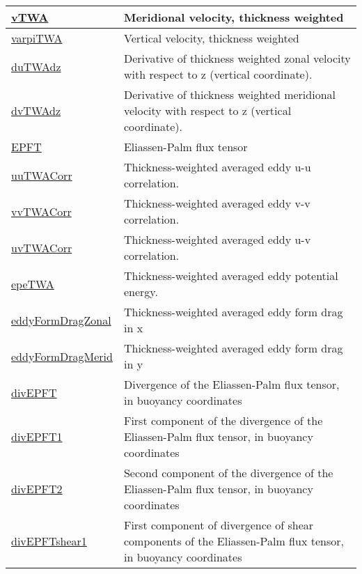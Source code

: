 {\begin{center}
\begin{longtable}{| p{2.0in} | p{4.0in} |}
    \hyperref[subsec:var_sec_eliassenPalmAM_vTWA]{vTWA} & Meridional velocity, thickness weighted \\
    \hline
    \hyperref[subsec:var_sec_eliassenPalmAM_varpiTWA]{varpiTWA} & Vertical velocity, thickness weighted \\
    \hline
    \hyperref[subsec:var_sec_eliassenPalmAM_duTWAdz]{duTWAdz} & Derivative of thickness weighted zonal velocity with respect to z (vertical coordinate). \\
    \hline
    \hyperref[subsec:var_sec_eliassenPalmAM_dvTWAdz]{dvTWAdz} & Derivative of thickness weighted meridional velocity with respect to z (vertical coordinate). \\
    \hline
    \hyperref[subsec:var_sec_eliassenPalmAM_EPFT]{EPFT} & Eliassen-Palm flux tensor \\
    \hline
    \hyperref[subsec:var_sec_eliassenPalmAM_uuTWACorr]{uuTWACorr} & Thickness-weighted averaged eddy u-u correlation. \\
    \hline
    \hyperref[subsec:var_sec_eliassenPalmAM_vvTWACorr]{vvTWACorr} & Thickness-weighted averaged eddy v-v correlation. \\
    \hline
    \hyperref[subsec:var_sec_eliassenPalmAM_uvTWACorr]{uvTWACorr} & Thickness-weighted averaged eddy u-v correlation. \\
    \hline
    \hyperref[subsec:var_sec_eliassenPalmAM_epeTWA]{epeTWA} & Thickness-weighted averaged eddy potential energy. \\
    \hline
    \hyperref[subsec:var_sec_eliassenPalmAM_eddyFormDragZonal]{eddyFormDragZonal} & Thickness-weighted averaged eddy form drag in x \\
    \hline
    \hyperref[subsec:var_sec_eliassenPalmAM_eddyFormDragMerid]{eddyFormDragMerid} & Thickness-weighted averaged eddy form drag in y \\
    \hline
    \hyperref[subsec:var_sec_eliassenPalmAM_divEPFT]{divEPFT} & Divergence of the Eliassen-Palm flux tensor, in buoyancy coordinates \\
    \hline
    \hyperref[subsec:var_sec_eliassenPalmAM_divEPFT1]{divEPFT1} & First component of the divergence of the Eliassen-Palm flux tensor, in buoyancy coordinates \\
    \hline
    \hyperref[subsec:var_sec_eliassenPalmAM_divEPFT2]{divEPFT2} & Second component of the divergence of the Eliassen-Palm flux tensor, in buoyancy coordinates \\
    \hline
    \hyperref[subsec:var_sec_eliassenPalmAM_divEPFTshear1]{divEPFTshear1} & First component of divergence of shear components of the Eliassen-Palm flux tensor, in buoyancy coordinates \\

\end{longtable}
\end{center}}
